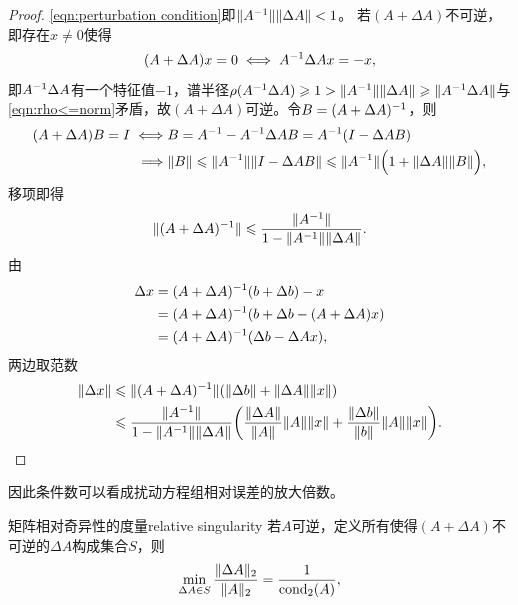 \begin{proof}
    \eqref{eqn:perturbation condition}即$\lVert A^{-1}\rVert\lVert\Delta A\rVert < 1$。
    若$(A + \Delta A)$不可逆，即存在$x \neq 0$使得
    \[
        (A + \Delta A)x = 0 \iff A^{-1}\Delta A x = -x,
    \]
    即$A^{-1}\Delta A$有一个特征值$-1$，谱半径$\rho(A^{-1}\Delta A) \geqslant 1 > \lVert A^{-1}\rVert\lVert\Delta A\rVert \geqslant \lVert A^{-1}\Delta A\rVert$与\eqref{eqn:rho<=norm}矛盾，故$(A + \Delta A)$可逆。令$B = (A + \Delta A)^{-1}$，则
    \begin{align*}
        (A + \Delta A)B = I \iff&B = A^{-1} - A^{-1}\Delta AB = A^{-1}(I - \Delta AB)\\
        \implies&\lVert B\rVert \leqslant \lVert A^{-1}\rVert\lVert I - \Delta AB\rVert \leqslant \lVert A^{-1}\rVert\Bigl(1 + \lVert\Delta A\rVert\lVert B\rVert\Bigr),
    \end{align*}
    移项即得
    \begin{equation}
        \lVert(A + \Delta A)^{-1}\rVert \leqslant \frac{\lVert A^{-1}\rVert}{1 - \lVert A^{-1}\rVert\lVert\Delta A\rVert}.
    \end{equation}
    由
    \begin{align*}
        \Delta x &= (A + \Delta A)^{-1}(b + \Delta b) - x\\
        &= (A + \Delta A)^{-1}(b + \Delta b - (A + \Delta A)x)\\
        &= (A + \Delta A)^{-1}(\Delta b - \Delta Ax),
    \end{align*}
    两边取范数
    \begin{align*}
        \lVert\Delta x\rVert &\leqslant \lVert(A + \Delta A)^{-1}\rVert(\lVert\Delta b\rVert + \lVert\Delta A\rVert\lVert x\rVert)\\
        &\leqslant \frac{\lVert A^{-1}\rVert}{1 - \lVert A^{-1}\rVert\lVert\Delta A\rVert}\biggl(\frac{\lVert\Delta A\rVert}{\lVert A\rVert}\lVert A\rVert\lVert x\rVert + \frac{\lVert\Delta b\rVert}{\lVert b\rVert}\lVert A\rVert\lVert x\rVert\biggr).
        \qedhere
    \end{align*}
\end{proof}

\begin{remark}
    因此条件数可以看成扰动方程组相对误差的放大倍数。
\end{remark}

\begin{theorem}
    {矩阵相对奇异性的度量}{relative singularity}
    若$A$可逆，定义所有使得$(A + \Delta A)$不可逆的$\Delta A$构成集合$S$，则
    \begin{equation}
        \min_{\Delta A\in S}\frac{\lVert\Delta A\rVert_2}{\lVert A\rVert_2} = \frac1{\operatorname{cond}_2(A)},
    \end{equation}
\end{theorem}

